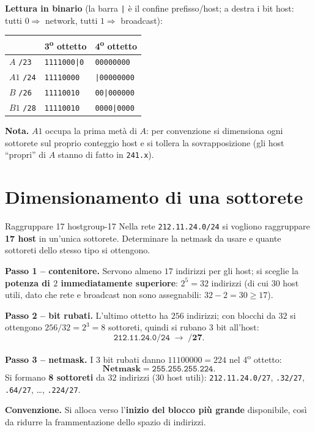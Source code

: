 \documentclass{report}
\begin{document}
\begin{solution}
\textbf{Lettura in binario} (la barra \texttt{|} è il confine prefisso/host; a
destra i bit host: tutti $0\Rightarrow$ network, tutti $1\Rightarrow$ broadcast):
\begin{center}
\begin{tabular}{lll}
\hline
 & 3\textsuperscript{o} ottetto & 4\textsuperscript{o} ottetto \\
\hline
$A$ \texttt{/23}  & \texttt{1111000|0} & \texttt{00000000} \\
$A1$ \texttt{/24} & \texttt{11110000}  & \texttt{|00000000} \\
$B$ \texttt{/26}  & \texttt{11110010}  & \texttt{00|000000} \\
$B1$ \texttt{/28} & \texttt{11110010}  & \texttt{0000|0000} \\
\hline
\end{tabular}
\end{center}

\textbf{Nota.} $A1$ occupa la prima metà di $A$: per convenzione si dimensiona
ogni sottorete sul proprio conteggio host e si tollera la sovrapposizione (gli
host ``propri'' di $A$ stanno di fatto in \texttt{241.x}).
\end{solution}


\section{Dimensionamento di una sottorete}

\begin{Exercise}{Raggruppare 17 host}{group-17}
Nella rete \texttt{212.11.24.0/24} si vogliono raggruppare \textbf{17 host} in
un'unica sottorete. Determinare la netmask da usare e quante sottoreti dello
stesso tipo si ottengono.
\end{Exercise}

\begin{solution}
\textbf{Passo 1 -- contenitore.} Servono almeno $17$ indirizzi per gli host;
si sceglie la \textbf{potenza di $2$ immediatamente superiore}: $2^5 = 32$
indirizzi (di cui $30$ host utili, dato che rete e broadcast non sono
assegnabili: $32 - 2 = 30 \ge 17$).

\textbf{Passo 2 -- bit rubati.} L'ultimo ottetto ha $256$ indirizzi; con blocchi
da $32$ si ottengono $256/32 = 2^3 = 8$ sottoreti, quindi si rubano $3$ bit
all'host:
\[
\texttt{212.11.24.0/24} \;\longrightarrow\; \textbf{/27}.
\]

\textbf{Passo 3 -- netmask.} I $3$ bit rubati danno $11100000 = 224$ nel
4\textsuperscript{o} ottetto:
\[
\textbf{Netmask} = \texttt{255.255.255.224}.
\]
Si formano \textbf{8 sottoreti} da $32$ indirizzi ($30$ host utili):
\texttt{212.11.24.0/27}, \texttt{.32/27}, \texttt{.64/27}, \dots, \texttt{.224/27}.

\medskip
\textbf{Convenzione.} Si alloca verso l'\textbf{inizio del blocco più grande}
disponibile, così da ridurre la frammentazione dello spazio di indirizzi.
\end{solution}
\end{document}
